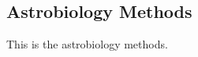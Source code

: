 \subsection{Astrobiology Methods}
\label{sec:Astrobiology-Methods}

This is the astrobiology methods.
